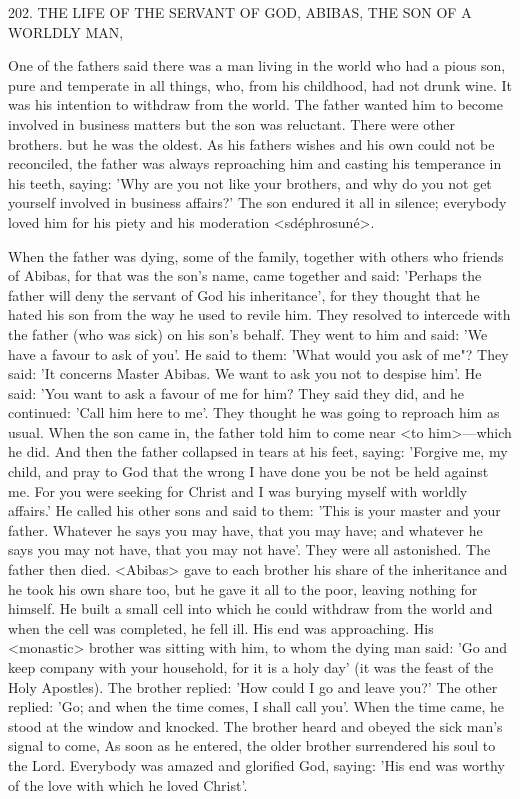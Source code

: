 202.
THE LIFE OF THE SERVANT OF GOD,
ABIBAS, THE SON OF A WORLDLY MAN,

One of the fathers said there was a man living in the world who had
a pious son, pure and temperate in all things, who, from his
childhood, had not drunk wine.
It was his intention to withdraw
from the world.
The father wanted him to become involved in
business matters but the son was reluctant.
There were other
brothers.
but he was the oldest.
As his father\textquotesingle s wishes and his own
could not be reconciled, the father was always reproaching him and
casting his temperance in his teeth, saying: 'Why are you not like
your brothers, and why do you not get yourself involved in business
affairs?' The son endured it all in silence; everybody loved him for
his piety and his moderation <sdéphrosuné>.

When the father was dying, some of the family, together with
others who friends of Abibas, for that was the son's name, came
together and said: 'Perhaps the father will deny the servant of God
his inheritance', for they thought that he hated his son from the way
he used to revile him.
They resolved to intercede with the father
(who was sick) on his son's behalf.
They went to him and said: 'We
have a favour to ask of you'.
He said to them: 'What would you ask
of me"? They said: 'It concerns Master Abibas.
We want to ask you
not to despise him'.
He said: 'You want to ask a favour of me for
him? They said they did, and he continued: 'Call him here to me'.
They thought he was going to reproach him as usual.
When the son
came in, the father told him to come near <to him>—which he did.
And then the father collapsed in tears at his feet, saying: 'Forgive
me, my child, and pray to God that the wrong I have done you be
not be held against me.
For you were seeking for Christ and I was
burying myself with worldly affairs.' He called his other sons and
said to them: 'This is your master and your father.
Whatever he
says you may have, that you may have; and whatever he says you
may not have, that you may not have'.
They were all astonished.
The father then died.
<Abibas> gave to each brother his share of
the inheritance and he took his own share too, but he gave it all to
the poor, leaving nothing for himself.
He built a small cell into
which he could withdraw from the world and when the cell was
completed, he fell ill.
His end was approaching.
His <monastic>
brother was sitting with him, to whom the dying man said: 'Go and
keep company with your household, for it is a holy day' (it was the
feast of the Holy Apostles).
The brother replied: 'How could I go
and leave you?' The other replied: 'Go; and when the time comes,
I shall call you'.
When the time came, he stood at the window and
knocked.
The brother heard and obeyed the sick man's signal to
come, As soon as he entered, the older brother surrendered his soul
to the Lord.
Everybody was amazed and glorified God, saying: 'His
end was worthy of the love with which he loved Christ'.

